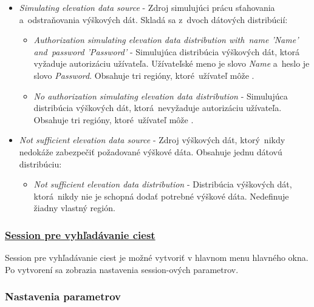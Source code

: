 \documentclass[12pt,a4paper]{report}
\begin{document}
\begin{itemize}
    \item \textit{Simulating elevation data source} - Zdroj simulujúci prácu sťahovania a~odstraňovania výškových dát. Skladá sa z~dvoch dátových distribúcií:
    \begin{itemize}
        \item \textit{ Authorization simulating elevation data distribution with~name 'Name' and~password 'Password'} - Simulujúca distribúcia výškových dát, ktorá vyžaduje autorizáciu užívateľa. Užívateľské meno je slovo \textit{Name} a~heslo je slovo \textit{Password}. Obsahuje tri regióny, ktoré~užívateľ môže .
        \item \textit{No authorization simulating elevation data distribution} - Simulujúca distribúcia výškových dát, ktorá~nevyžaduje autorizáciu užívateľa. Obsahuje tri regióny, ktoré~užívateľ môže .
    \end{itemize}
    \item \textit{Not sufficient elevation data source} - Zdroj výškových dát, ktorý~nikdy nedokáže zabezpečiť požadované výškové dáta. Obsahuje jednu dátovú distribúciu:
    \begin{itemize}
        \item \textit{Not sufficient elevation data distribution} - Distribúcia výškových dát, ktorá~nikdy nie je schopná dodať potrebné výškové dáta. Nedefinuje žiadny vlastný región.
    \end{itemize}
\end{itemize}

\pagebreak

\subsubsection{\underline{Session pre vyhľadávanie ciest}}

Session pre vyhľadávanie ciest je možné vytvoriť v hlavnom menu hlavného okna. Po vytvorení sa zobrazia nastavenia session-ových parametrov. 

\subsubsection{Nastavenia parametrov}

\begin{figure}[h]\centering
{}
\end{figure}
\end{document}
